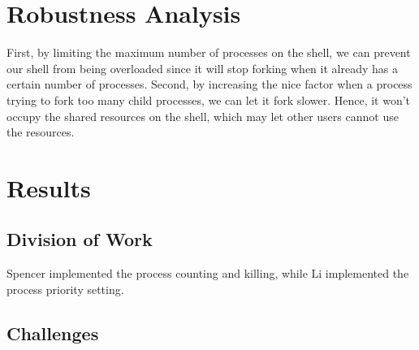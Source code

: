 \documentclass{article}
\begin{document}
\section{Robustness Analysis}

First, by limiting the maximum number of processes on the shell, we can prevent our shell from being overloaded since it will stop forking when it already has a certain number of processes.
Second, by increasing the nice factor when a process trying to fork too many child processes, we can let it fork slower.  Hence, it won’t occupy the shared resources on the shell, which may let other users cannot use the resources. \\ 





\section{Results}


\subsection{Division of Work}
Spencer implemented the process counting and killing, while Li implemented the
process priority setting.

\subsection{Challenges}








\end{document}

